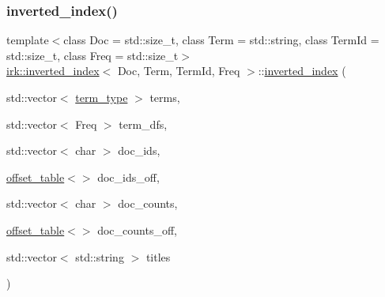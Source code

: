 \subsubsection{\texorpdfstring{inverted\+\_\+index()}{inverted\_index()}\hspace{0.1cm}{\footnotesize\ttfamily [1/2]}}
{\footnotesize\ttfamily template$<$class Doc  = std\+::size\+\_\+t, class Term  = std\+::string, class Term\+Id  = std\+::size\+\_\+t, class Freq  = std\+::size\+\_\+t$>$ \\
\mbox{\hyperlink{classirk_1_1inverted__index}{irk\+::inverted\+\_\+index}}$<$ Doc, Term, Term\+Id, Freq $>$\+::\mbox{\hyperlink{classirk_1_1inverted__index}{inverted\+\_\+index}} (\begin{DoxyParamCaption}\item[{std\+::vector$<$ \mbox{\hyperlink{classirk_1_1inverted__index_a7a60c2cec1774c08f21e8e27ccb5ac33}{term\+\_\+type}} $>$}]{terms,  }\item[{std\+::vector$<$ Freq $>$}]{term\+\_\+dfs,  }\item[{std\+::vector$<$ char $>$}]{doc\+\_\+ids,  }\item[{\mbox{\hyperlink{classirk_1_1offset__table}{offset\+\_\+table}}$<$$>$}]{doc\+\_\+ids\+\_\+off,  }\item[{std\+::vector$<$ char $>$}]{doc\+\_\+counts,  }\item[{\mbox{\hyperlink{classirk_1_1offset__table}{offset\+\_\+table}}$<$$>$}]{doc\+\_\+counts\+\_\+off,  }\item[{std\+::vector$<$ std\+::string $>$}]{titles }\end{DoxyParamCaption})\hspace{0.3cm}{\ttfamily [inline]}}

\mbox{\label{classirk_1_1inverted__index_a8b9969577ec0556c38ea05d5cc674fb8}} 
